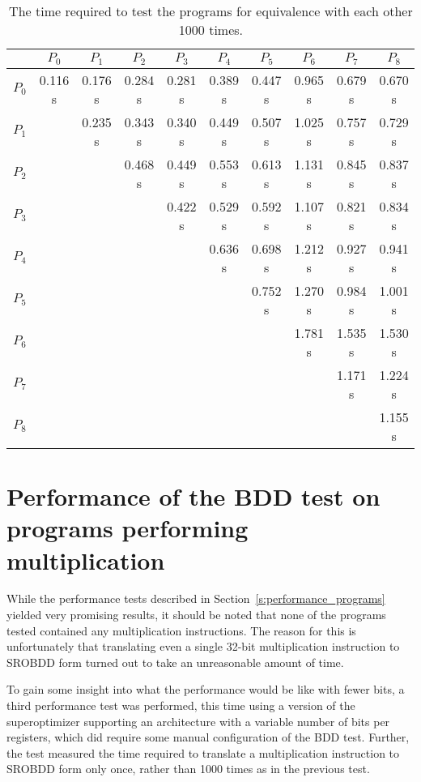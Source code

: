\documentclass[a4paper,11pt]{kth-mag}
\begin{document}
\begin{table}
\centering
\begin{tabular}{l|*{9}{c}}
      & $P_0$   & $P_1$   & $P_2$   & $P_3$   & $P_4$   & $P_5$   & $P_6$   & $P_7$   & $P_8$   \\
\hline
$P_0$ & 0.116 s & 0.176 s & 0.284 s & 0.281 s & 0.389 s & 0.447 s & 0.965 s & 0.679 s & 0.670 s \\
$P_1$ &         & 0.235 s & 0.343 s & 0.340 s & 0.449 s & 0.507 s & 1.025 s & 0.757 s & 0.729 s \\
$P_2$ &         &         & 0.468 s & 0.449 s & 0.553 s & 0.613 s & 1.131 s & 0.845 s & 0.837 s \\
$P_3$ &         &         &         & 0.422 s & 0.529 s & 0.592 s & 1.107 s & 0.821 s & 0.834 s \\
$P_4$ &         &         &         &         & 0.636 s & 0.698 s & 1.212 s & 0.927 s & 0.941 s \\
$P_5$ &         &         &         &         &         & 0.752 s & 1.270 s & 0.984 s & 1.001 s \\
$P_6$ &         &         &         &         &         &         & 1.781 s & 1.535 s & 1.530 s \\
$P_7$ &         &         &         &         &         &         &         & 1.171 s & 1.224 s \\
$P_8$ &         &         &         &         &         &         &         &         & 1.155 s \\
\end{tabular}
\caption{The time required to test the programs for equivalence with each other 1000 times.}
\label{tab:performance2}
\end{table}


\section{Performance of the BDD test on programs performing multiplication}
\label{s:performance_mul}

While the performance tests described in Section~\ref{s:performance_programs} yielded very promising results, it should be noted that none of the programs tested contained any multiplication instructions.
The reason for this is unfortunately that translating even a single 32-bit multiplication instruction to SROBDD form turned out to take an unreasonable amount of time.

To gain some insight into what the performance would be like with fewer bits, a third performance test was performed, this time using a version of the superoptimizer supporting an architecture with a variable number of bits per registers, which did require some manual configuration of the BDD test.
Further, the test measured the time required to translate a multiplication instruction to SROBDD form only once, rather than 1000 times as in the previous test.
\end{document}
